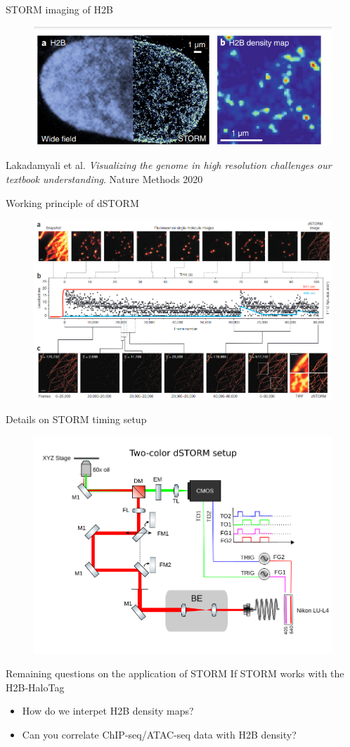 \documentclass[aspectratio=1610]{beamer}					%
\begin{document}
\begin{frame}{STORM imaging of H2B}
\begin{figure}
\includegraphics[width=12cm]{STORM.png}
\end{figure}
Lakadamyali et al. \textit{Visualizing the genome in high resolution
challenges our textbook understanding}. Nature Methods 2020
\end{frame}

\begin{frame}{Working principle of dSTORM}
\begin{figure}
\includegraphics[width=13cm]{dSTORM2.png}
\end{figure}
\end{frame}

\begin{frame}{Details on STORM timing setup}
\begin{figure}
\includegraphics[width=12cm]{dSTORM.png}
\end{figure}
\end{frame}

\begin{frame}{Remaining questions on the application of STORM}
If STORM works with the H2B-HaloTag
\begin{itemize}
\item How do we interpet H2B density maps?
\item Can you correlate ChIP-seq/ATAC-seq data with H2B density?
\end{itemize}
\end{frame}
\end{document}
